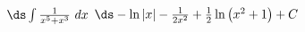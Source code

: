 {$\ds \int \frac{1}{x^5+x^3}\ dx$}
{$\ds -\ln |x| - \frac{1}{2x^2} + \frac{1}{2} \ln\left(x^2+1\right)+C$}
